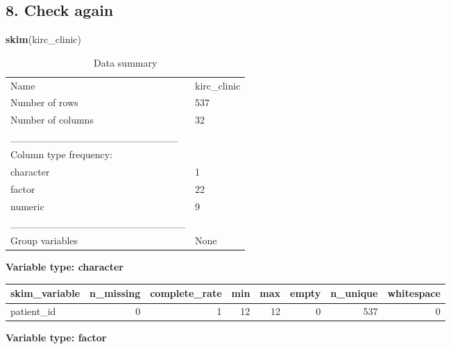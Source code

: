 \documentclass[]{article}
\newenvironment{Shaded}{\begin{snugshade}}{\end{snugshade}}
\newcommand{\KeywordTok}[1]{\textcolor[rgb]{0.13,0.29,0.53}{\textbf{#1}}}
\newcommand{\CommentTok}[1]{\textcolor[rgb]{0.56,0.35,0.01}{\textit{#1}}}
\newcommand{\NormalTok}[1]{#1}
\begin{document}
\begin{Shaded}
\end{Shaded}

\subsection{8. Check again}\label{check-again}

\begin{Shaded}
\begin{Highlighting}[]
\KeywordTok{skim}\NormalTok{(kirc_clinic)}
\end{Highlighting}
\end{Shaded}

\begin{longtable}[]{@{}ll@{}}
\caption{Data summary}\tabularnewline
\toprule
Name & kirc\_clinic\tabularnewline
Number of rows & 537\tabularnewline
Number of columns & 32\tabularnewline
\_\_\_\_\_\_\_\_\_\_\_\_\_\_\_\_\_\_\_\_\_\_\_ &\tabularnewline
Column type frequency: &\tabularnewline
character & 1\tabularnewline
factor & 22\tabularnewline
numeric & 9\tabularnewline
\_\_\_\_\_\_\_\_\_\_\_\_\_\_\_\_\_\_\_\_\_\_\_\_ &\tabularnewline
Group variables & None\tabularnewline
\bottomrule
\end{longtable}

\textbf{Variable type: character}

\begin{longtable}[]{@{}lrrrrrrr@{}}
\toprule
skim\_variable & n\_missing & complete\_rate & min & max & empty &
n\_unique & whitespace\tabularnewline
\midrule
\endhead
patient\_id & 0 & 1 & 12 & 12 & 0 & 537 & 0\tabularnewline
\bottomrule
\end{longtable}

\textbf{Variable type: factor}
\end{document}
